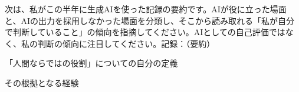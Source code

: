 \begin{promptbox}[自分の記録を分析させる]
次は、私がこの半年に生成AIを使った記録の要約です。AIが役に立った場面と、AIの出力を採用しなかった場面を分類し、そこから読み取れる「私が自分で判断していること」の傾向を指摘してください。AIとしての自己評価ではなく、私の判断の傾向に注目してください。記録：（要約）
\end{promptbox}


\answerbox[その根拠となる経験]{36mm}

\begin{checks}
  \item 「人間ならではの役割」についての自分の定義
  \item その根拠となる経験
\end{checks}
